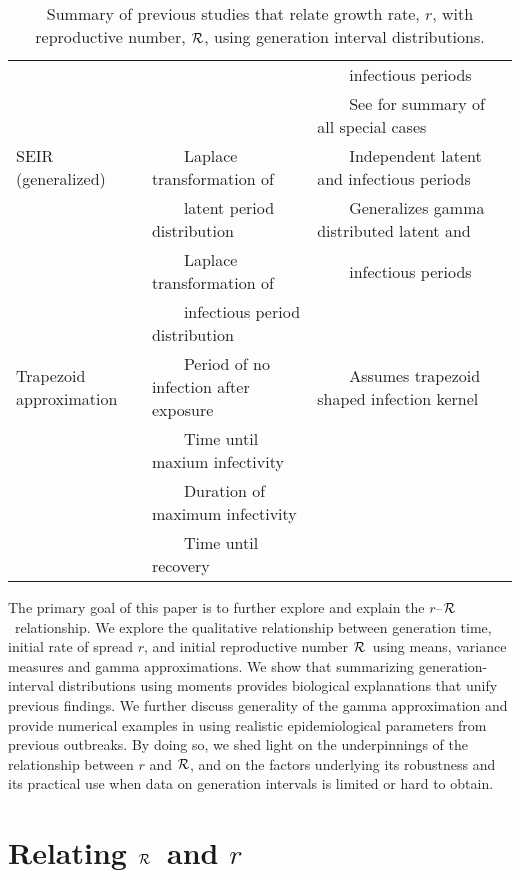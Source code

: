 \documentclass[12pt]{article}
\newcommand{\rR}{\mbox{$r$--$\cal R$}}
\newcommand{\RR}{\ensuremath{{\cal R}}}
\newcommand{\tlab}[1]{\label{tab:#1}}
\newcommand{\tabitem}{~~\llap{\textbullet}~~}
\newcommand{\tabphant}{\hphantom\tabitem}
\begin{document}
{\begin{landscape}
\begin{table}[h]
\begin{tabular}{l|l|l|c}
& & \tabphant infectious periods & \\
& & \tabitem See \cite{yan2008separate} for summary of all special cases & \\
\hline
SEIR (generalized) & \tabitem Laplace transformation of & \tabitem Independent latent and infectious periods & \cite{yan2008separate} \\
 & \tabphant latent period distribution & \tabitem Generalizes gamma distributed latent and & \\
 & \tabitem Laplace transformation of & \tabphant infectious periods & \\
 & \tabphant infectious period distribution & & \\
\hline
Trapezoid approximation & \tabitem Period of no infection after exposure & \tabitem Assumes trapezoid shaped infection kernel & \cite{roberts2007model} \\
& \tabitem Time until maxium infectivity& & \\
& \tabitem Duration of maximum infectivity & & \\
& \tabitem Time until recovery & &\\
\hline
\end{tabular}
\caption{
Summary of previous studies that relate growth rate, $r$, with reproductive number, $\RR$, using generation interval distributions.
}
\tlab{review}
\end{table}
\end{landscape}
}

The primary goal of this paper is to further explore and explain the \rR\ relationship.
We explore the qualitative relationship between generation time, initial rate of spread $r$, and initial reproductive number \RR\ using means, variance measures and gamma approximations.
We show that summarizing generation-interval distributions using moments provides biological explanations that unify previous findings.
We further discuss generality of the gamma approximation and provide numerical examples in using realistic epidemiological parameters from previous outbreaks.
By doing so, we shed light on the underpinnings of the relationship between $r$ and \RR, and on the factors underlying its robustness and its practical use when data on generation intervals is limited or hard to obtain.

\section{Relating \RR\ and $r$}
\end{document}

